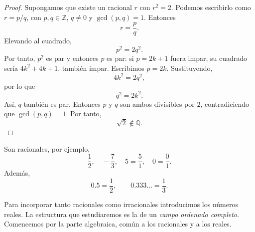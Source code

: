 \begin{proof}
Supongamos que existe un racional $r$ con $r^2=2$. Podemos escribirlo como $r=p/q$, con $p,q\in\mathbb{Z}$, $q\neq0$ y $\gcd(p,q)=1$. Entonces
\[
r=\frac pq.
\]
Elevando al cuadrado,
\[
p^2=2q^2.
\]
Por tanto, $p^2$ es par y entonces $p$ es par: si $p=2k+1$ fuera impar, su cuadrado sería $4k^2+4k+1$, también impar. Escribimos $p=2k$. Sustituyendo,
\[
4k^2=2q^2,
\]
por lo que
\[
q^2=2k^2.
\]
Así, $q$ también es par. Entonces $p$ y $q$ son ambos divisibles por $2$, contradiciendo que $\gcd(p,q)=1$. Por tanto,
\[
\sqrt2\notin\mathbb{Q}.
\]
\end{proof}

\begin{example}
Son racionales, por ejemplo,
\[
\frac12,\quad -\frac73,\quad 5=\frac51,\quad 0=\frac01.
\]
Además,
\[
0.5=\frac12,
\qquad
0.333\ldots=\frac13.
\]
\end{example}

Para incorporar tanto racionales como irracionales introducimos los números reales. La estructura que estudiaremos es la de un \emph{campo ordenado completo}. Comencemos por la parte algebraica, común a los racionales y a los reales.

